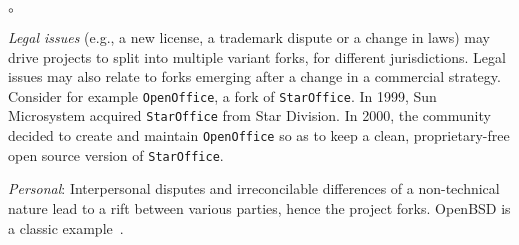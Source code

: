 \begin{list}{$\circ$}{}
\item \textit{Legal issues} (e.g., a new license, a trademark dispute or a change in laws) may drive projects to split into multiple variant forks, for different jurisdictions. %
Legal issues may also relate to forks emerging after a change in a commercial strategy. Consider for example \texttt{OpenOffice}, a fork of \texttt{StarOffice}. In 1999, Sun Microsystem acquired \texttt{StarOffice} from Star Division. In 2000, the community decided to create and maintain \texttt{OpenOffice} so as to keep a clean, proprietary-free open source version of \texttt{StarOffice}. %

\item \textit{Personal}: Interpersonal disputes and irreconcilable differences of a non-technical nature lead to a rift between various parties, hence the project forks. OpenBSD is a classic example~\cite{Zhou:2020}.


\end{list}



